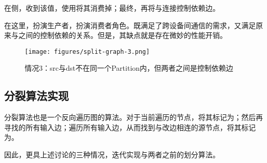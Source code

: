 在侧，收到该值，使用将其消费掉；最终，再将与连接控制依赖边。

在这里，扮演生产者，扮演消费者角色。既满足了跨设备间通信的需求，又满足原来与之间的控制依赖的关系。但是，其缺点就是存在微妙的性能开销。

\begin{figure}[H]
\centering
\texttt{[image: figures/split-graph-3.png]}
\caption{情况3：src与dst不在同一个Partition内，但两者之间是控制依赖边}
 \label{fig:split-graph-3}
\end{figure}

\subsection{分裂算法实现}

分裂算法也是一个反向遍历图的算法。对于当前遍历的节点，将其标记为；然后再寻找的所有输入边；遍历所有输入边，从而找到与改边相连的源节点，将其标记为。

因此，更具上述讨论的三种情况，迭代实现与两者之前的划分算法。

